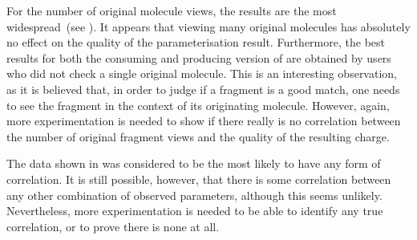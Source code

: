 For the number of original molecule views, the results are the most widespread~(see ). It appears that viewing many original molecules has absolutely no effect on the quality of the parameterisation result. Furthermore, the best results for both the consuming and producing version of \oframp{} are obtained by users who did not check a single original molecule. This is an interesting observation, as it is believed that, in order to judge if a fragment is a good match, one needs to see the fragment in the context of its originating molecule. However, again, more experimentation is needed to show if there really is no correlation between the number of original fragment views and the quality of the resulting charge.

The data shown in  was considered to be the most likely to have any form of correlation. It is still possible, however, that there is some correlation between any other combination of observed parameters, although this seems unlikely. Nevertheless, more experimentation is needed to be able to identify any true correlation, or to prove there is none at all.
